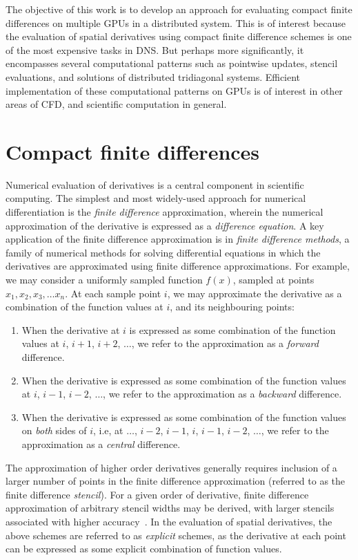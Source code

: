 The objective of this work is to develop an
approach for evaluating
compact finite differences
on multiple GPUs in a distributed system.
This is of interest because
the evaluation of spatial derivatives using
compact finite difference schemes is one of the most
expensive tasks in DNS.
But perhaps more significantly,
it encompasses several computational patterns
such as pointwise updates, stencil evaluations,
and solutions of distributed tridiagonal systems.
Efficient implementation of these computational patterns
on GPUs is of interest in other areas of CFD,
and scientific computation in general.

\section{Compact finite differences}

Numerical evaluation of derivatives is a central component
in scientific computing.
The simplest and most widely-used approach for numerical differentiation
is the \emph{finite difference} approximation,
wherein the numerical approximation of the derivative
is expressed as a \emph{difference equation}.
A key application of the finite difference approximation
is in \emph{finite difference methods},
a family of numerical methods for solving differential equations
in which the derivatives are approximated using
finite difference approximations.
%
For example, we may consider a uniformly sampled
function $f(x)$,
sampled at points $x_1, x_2, x_3, \hdots x_n$.
At each sample point $i$, we may approximate the derivative as
a combination of the function values at
$i$, and its neighbouring points:

\begin{enumerate}
    \item When the derivative at $i$ is expressed
        as some combination of the function values
        at $i$, $i+1$, $i+2$, $\hdots$,
        we refer to the approximation as a
        \emph{forward} difference.
        
    \item When the derivative is expressed as
        some combination of the function values
        at $i$, $i-1$, $i-2$, $\hdots$,
        we refer to the approximation as a
        \emph{backward} difference.

    \item When the derivative is expressed as
        some combination of the function values
        on \emph{both} sides of $i$, i.e,
        at $\hdots$, $i-2$, $i-1$, $i$, $i-1$, $i-2$, $\hdots$,
        we refer to the approximation as a
        \emph{central} difference.
\end{enumerate}
%
The approximation of higher order derivatives generally requires
inclusion of a larger number of points in the
finite difference approximation
(referred to as the finite difference \emph{stencil}).
For a given order of derivative,
finite difference approximation of arbitrary stencil widths
may be derived,
with larger stencils associated with higher accuracy~\cite{fornberg1988generation}.
In the evaluation of spatial derivatives,
the above schemes are referred to as \emph{explicit}
schemes, as the derivative at each point
can be expressed as some explicit combination of function values.


